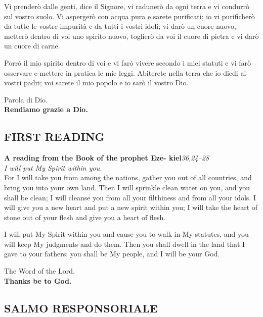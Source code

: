 \documentclass[10pt,b6paper,usenames,twoside]{article}
\begin{document}
Vi prenderò dalle genti, dice il Signore, vi radunerò da ogni terra e vi condurrò sul vostro suolo. Vi aspergerò con acqua pura e sarete purificati; io vi purificherò da tutte le vostre impurità e da tutti i vostri idoli; vi darò un cuore nuovo, metterò dentro di voi uno spirito nuovo, toglierò da voi il cuore di pietra e vi darò un cuore di carne.

Porrò il mio spirito dentro di voi e vi farò vivere secondo i miei statuti e vi farò osservare e mettere in pratica le mie leggi. Abiterete nella terra che io diedi ai vostri padri; voi sarete il mio popolo e io sarò il vostro Dio.

\noindent Parola di Dio.\\ \textbf{Rendiamo grazie a Dio.}

\clearpage
 
\subsection*{\textcolor{forestgreen(traditional)}{FIRST READING}} 
\noindent \textbf{A reading from the Book of the prophet Eze- \linebreak kiel}\hfill \textcolor{forestgreen(traditional)}{\textit{36,24--28}} \\ 
\textcolor{forestgreen(traditional)}{\textit{\footnotesize{I will put My Spirit within you.}}} \\ 

For I will take you from among the nations, gather you out of all countries, and bring you into your own land. Then I will sprinkle clean water on you, and you shall be clean; I will cleanse you from all your filthiness and from all your idols. I will give you a new heart and put a new spirit within you; I will take the heart of stone out of your flesh and give you a heart of flesh. 

I will put My Spirit within you and cause you to walk in My statutes, and you will keep My judgments and do them. Then you shall dwell in the land that I gave to your fathers; you shall be My people, and I will be your God.

\noindent The Word of the Lord.\\ \textbf{Thanks be to God.}

\subsection*{\textcolor{forestgreen(traditional)}{\textsc{SALMO RESPONSORIALE}}} 
\end{document}
